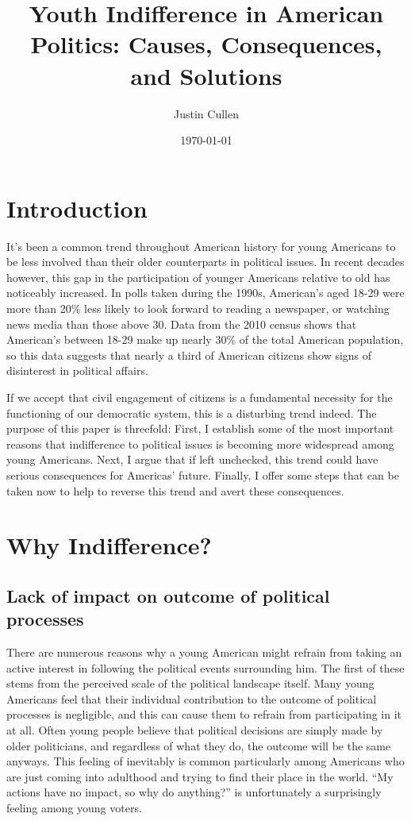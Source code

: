 \documentclass[12pt,letterpaper]{article}
\begin{document}
\title{Youth Indifference in American Politics: Causes, Consequences,
and Solutions}
\author{Justin Cullen}
\date{\today}
\maketitle

\section{Introduction} %
\label{sec:Introduction}
It's been a common trend throughout American history for young
Americans to be less involved than their older counterparts in
political issues.  In recent decades however, this gap in the
participation of younger Americans relative to old has noticeably
increased. In polls taken during the 1990s, American's aged 18-29 were
more than 20\% less likely to look forward to reading a newspaper, or
watching news media than those above 30. Data from the 2010 census
shows that American's between 18-29 make up nearly 30\% of the total
American population, so this data suggests that nearly a third of
American citizens show signs of disinterest in political affairs.
\cite{indif} 

If we accept that civil engagement of citizens is a fundamental
necessity for the functioning of our democratic system, this is a
disturbing trend indeed.  The purpose of this paper is threefold:
First, I establish some of the most important reasons that
indifference to political issues is becoming more widespread among
young Americans.  Next, I argue that if left unchecked, this trend
could have serious consequences for Americas' future.  Finally, I
offer some steps that can be taken now to help to reverse this trend
and avert these consequences. \cite{civic}

\section{Why Indifference?} %
\label{sec:Why Indifference?}

\subsection{Lack of impact on outcome of political processes} There
are numerous reasons why a young American might refrain from taking an
active interest in following the political events surrounding him.
The first of these stems from the perceived scale of the political
landscape itself.  Many young Americans feel that their individual
contribution to the outcome of political processes is negligible, and
this can cause them to refrain from participating in it at all.  Often
young people believe that political decisions are simply made by older
politicians, and regardless of what they do, the outcome will be the
same anyways.  This feeling of inevitably is common particularly among
Americans who are just coming into adulthood and trying to find their
place in the world. ``My actions have no impact, so why do anything?''
is unfortunately a surprisingly feeling among young voters. 
\end{document}
